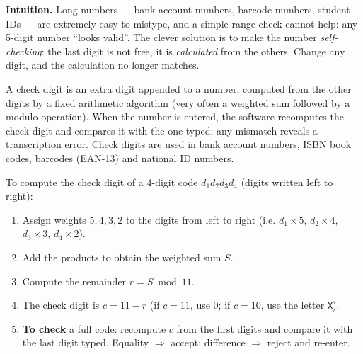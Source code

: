 \documentclass[11pt]{article}
\newcommand{\cle}[1]{{\popxbold\color{popdark}#1}}
\newcounter{popsec}
\newcounter{popsub}
\newcommand{\courssub}[1]{%
  \stepcounter{popsub}%
  \par\vspace{9pt}\noindent{\popxbold\fontsize{11.5}{13}\selectfont\color{popink}{\color{poporange}\thepopsec.\thepopsub}\hspace{6pt}#1}\par\nopagebreak\vspace{4pt}
}
\begin{document}
\courssub{Check Digits}

\textbf{Intuition.} Long numbers --- bank account numbers, barcode numbers, student IDs --- are extremely easy to mistype, and a simple range check cannot help: any 5-digit number ``looks valid''. The clever solution is to make the number \emph{self-checking}: the last digit is not free, it is \emph{calculated} from the others. Change any digit, and the calculation no longer matches.

\begin{definition}
A \cle{check digit} is an extra digit appended to a number, computed from the other digits by a fixed arithmetic algorithm (very often a weighted sum followed by a modulo operation). When the number is entered, the software recomputes the check digit and compares it with the one typed; any mismatch reveals a transcription error. Check digits are used in bank account numbers, ISBN book codes, barcodes (EAN-13) and national ID numbers.
\end{definition}

\begin{methode}
To compute the check digit of a 4-digit code $d_1 d_2 d_3 d_4$ (digits written left to right):
\begin{enumerate}
\item Assign weights $5, 4, 3, 2$ to the digits from left to right (i.e. $d_1\times 5$, $d_2\times 4$, $d_3\times 3$, $d_4\times 2$).
\item Add the products to obtain the weighted sum $S$.
\item Compute the remainder $r = S \bmod 11$.
\item The check digit is $c = 11 - r$ (if $c = 11$, use $0$; if $c = 10$, use the letter \texttt{X}).
\item \textbf{To check} a full code: recompute $c$ from the first digits and compare it with the last digit typed. Equality $\Rightarrow$ accept; difference $\Rightarrow$ reject and re-enter.
\end{enumerate}
\end{methode}
\end{document}
